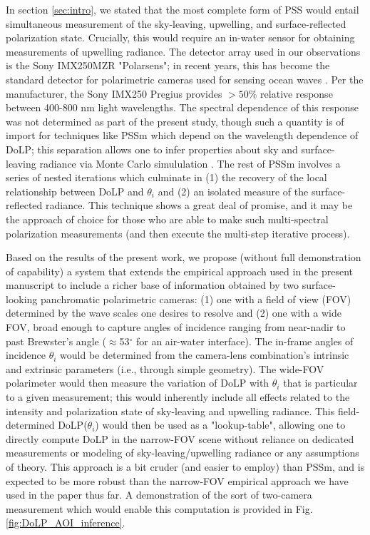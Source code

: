 \documentclass[letterpaper,draftcls,onecolumn]{IEEEtran}
\begin{document}
In section \ref{sec:intro}, we stated that the most complete form of PSS would entail simultaneous measurement of the sky-leaving, upwelling, and surface-reflected polarization state. Crucially, this would require an in-water sensor for obtaining measurements of upwelling radiance. The detector array used in our observations is the Sony IMX250MZR "Polarsens"; in recent years, this has become the standard detector for polarimetric cameras used for sensing ocean waves \cite{laxague_effects_2025}. Per the manufacturer, the Sony IMX250 Pregius provides $>50$\% relative response between 400-800 nm light wavelengths. The spectral dependence of this response was not determined as part of the present study, though such a quantity is of import for techniques like PSSm \cite{malinowski_surface_2024} which depend on the wavelength dependence of DoLP; this separation allows one to infer properties about sky and surface-leaving radiance via Monte Carlo simululation \cite{foster_characterization_2015,foster_polarized_2016}. The rest of PSSm involves a series of nested iterations which culminate in (1) the recovery of the local relationship between DoLP and $\theta_i$ and (2) an isolated measure of the surface-reflected radiance. This technique shows a great deal of promise, and it may be the approach of choice for those who are able to make such multi-spectral polarization measurements (and then execute the multi-step iterative process).

Based on the results of the present work, we propose (without full demonstration of capability) a system that extends the empirical approach used in the present manuscript to include a richer base of information obtained by two surface-looking panchromatic polarimetric cameras: (1) one with a field of view (FOV) determined by the wave scales one desires to resolve and (2) one with a wide FOV, broad enough to capture angles of incidence ranging from near-nadir to past Brewster's angle ($\approx$53$^{\circ}$ for an air-water interface). The in-frame angles of incidence $\theta_i$ would be determined from the camera-lens combination's intrinsic and extrinsic parameters (i.e., through simple geometry). The wide-FOV polarimeter would then measure the variation of DoLP with $\theta_i$ that is particular to a given measurement; this would inherently include all effects related to the intensity and polarization state of sky-leaving and upwelling radiance. This field-determined DoLP($\theta_i$) would then be used as a "lookup-table", allowing one to directly compute DoLP in the narrow-FOV scene without reliance on dedicated measurements or modeling of sky-leaving/upwelling radiance \cite{foster_characterization_2015,foster_polarized_2016} or any assumptions of theory. This approach is a bit cruder (and easier to employ) than PSSm, and is expected to be more robust than the narrow-FOV empirical approach we have used in the paper thus far. A demonstration of the sort of two-camera measurement which would enable this computation is provided in Fig. \ref{fig:DoLP_AOI_inference}.
\end{document}
